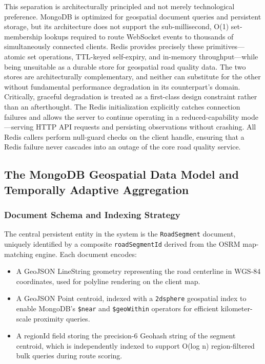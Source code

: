 \documentclass[conference]{IEEEtran}
\begin{document}
This separation is architecturally principled and not merely technological preference.
MongoDB is optimized for geospatial document queries and persistent storage, but its architecture does not support the sub-millisecond, O(1) set-membership lookups required to route WebSocket events to thousands of simultaneously connected clients.
Redis provides precisely these primitives---atomic set operations, TTL-keyed self-expiry, and in-memory throughput---while being unsuitable as a durable store for geospatial road quality data.
The two stores are architecturally complementary, and neither can substitute for the other without fundamental performance degradation in its counterpart's domain.
Critically, graceful degradation is treated as a first-class design constraint rather than an afterthought.
The Redis initialization explicitly catches connection failures and allows the server to continue operating in a reduced-capability mode---serving HTTP API requests and persisting observations without crashing. All Redis callers perform null-guard checks on the client handle, ensuring that a Redis failure never cascades into an outage of the core road quality service.

\subsection{The MongoDB Geospatial Data Model and Temporally Adaptive Aggregation}

\subsubsection{Document Schema and Indexing Strategy}
The central persistent entity in the system is the \texttt{RoadSegment} document, uniquely identified by a composite \texttt{roadSegmentId} derived from the OSRM map-matching engine. Each document encodes:
\begin{itemize}
    \item A GeoJSON LineString geometry representing the road 
centerline in WGS-84 coordinates, used for polyline rendering on the client map.
    \item A GeoJSON Point centroid, indexed with a \texttt{2dsphere} geospatial index to enable MongoDB's \texttt{\$near} and \texttt{\$geoWithin} operators for efficient kilometer-scale proximity queries.
    \item A regionId field storing the precision-6 Geohash string of the segment centroid, which is independently indexed to support O(log n) region-filtered bulk queries during route scoring.
\end{itemize}
\end{document}
